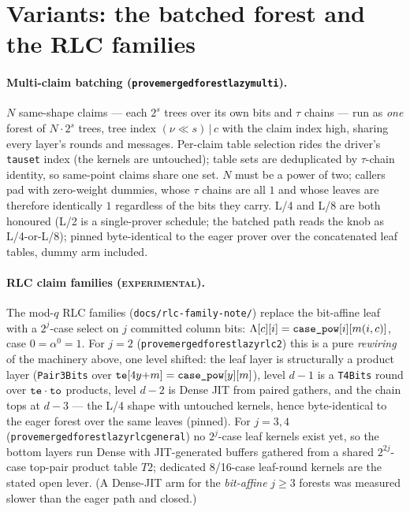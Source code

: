 \documentclass[11pt]{article}
\newcommand{\code}[1]{{\def\_{\textunderscore\allowbreak}\texttt{#1}}}
\theoremstyle{definition}
\begin{document}
\section{Variants: the batched forest and the RLC families}
\label{sec:variants}

\paragraph{Multi-claim batching (\code{prove\_merged\_forest\_lazy\_multi}).}
$N$ same-shape claims --- each $2^s$ trees over its own bits and
$\tau$ chains --- run as \emph{one} forest of $N\cdot 2^s$ trees, tree
index $(\nu \ll s)\,|\,c$ with the claim index high, sharing every
layer's rounds and messages.  Per-claim table selection rides the
driver's \code{tau\_set} index (the kernels are untouched); table sets
are deduplicated by $\tau$-chain identity, so same-point claims share
one set.  $N$ must be a power of two; callers pad with zero-weight
dummies, whose $\tau$ chains are all $1$ and whose leaves are therefore
identically $1$ regardless of the bits they carry.  L/4 and L/8 are both
honoured (L/2 is a single-prover schedule; the batched path reads the
knob as L/4-or-L/8); pinned byte-identical to the eager prover over the
concatenated leaf tables, dummy arm included.

\paragraph{RLC claim families (\textsc{experimental}).}
The mod-$q$ RLC families (\code{docs/rlc-family-note/}) replace the
bit-affine leaf with a $2^j$-case select on $j$ committed column bits:
$\Lambda[c][i] = \code{case\_pow}[i][m(i,c)]$, case $0 = \alpha^0 = 1$.
For $j = 2$ (\code{prove\_merged\_forest\_lazy\_rlc2}) this is a pure
\emph{rewiring} of the machinery above, one level shifted: the leaf
layer is structurally a product layer (\code{Pair3Bits} over
$\code{te}[4y{+}m] = \code{case\_pow}[y][m]$), level $d{-}1$ is a
\code{T4Bits} round over $\code{te}\cdot\code{to}$ products, level
$d{-}2$ is Dense JIT from paired gathers, and the chain tops at $d{-}3$
--- the L/4 shape with untouched kernels, hence byte-identical to the
eager forest over the same leaves (pinned).  For $j = 3, 4$
(\code{prove\_merged\_forest\_lazy\_rlc\_general}) no $2^j$-case leaf
kernels exist yet, so the bottom layers run Dense with JIT-generated
buffers gathered from a shared $2^{2j}$-case top-pair product table
$T2$; dedicated 8/16-case leaf-round kernels are the stated open lever.
(A Dense-JIT arm for the \emph{bit-affine} $j \ge 3$ forests was
measured slower than the eager path and closed.)
\end{document}
